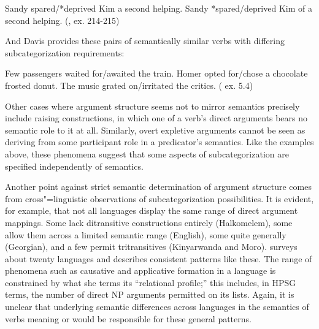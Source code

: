 \documentclass[output=paper
                ,modfonts
                ,nonflat
	        ,collection
	        ,collectionchapter
	        ,collectiontoclongg
 	        ,biblatex
                ,babelshorthands
                ,newtxmath
                ,draftmode
                ,colorlinks, citecolor=brown
]{./langsci/langscibook}
\begin{document}
\begin{exe}
\ex \label{ps-subcat-ex}
\begin{xlist}
\ex    Sandy spared/*deprived Kim a second helping.
\ex    Sandy *spared/deprived Kim of a second helping.
(\citet{pollard+sag:1987}, ex. 214-215)
\end{xlist}
\end{exe}

\noindent
And Davis provides these pairs of semantically similar verbs with differing subcategorization requirements:

\begin{exe}
\ex \label{ard-subcat-ex}
\begin{xlist}
\ex    Few passengers waited for/awaited the train.
\ex    Homer opted for/chose a chocolate frosted donut.
\ex    The music grated on/irritated the critics.
(\citet{Davis2001} ex. 5.4)
\end{xlist}
\end{exe}

Other cases where argument structure seems not to mirror semantics precisely include raising constructions, in which one of a verb's direct arguments bears no semantic role to it at all.
Similarly, overt expletive arguments cannot be seen as deriving from some participant role in a predicator's semantics.
Like the examples above, these phenomena suggest that some aspects of subcategorization are specified independently of semantics.

Another point against strict semantic determination of argument structure comes from cross"=linguistic observations of subcategorization possibilities.
It is evident, for example, that not all languages display the same range of direct argument mappings.
Some lack ditransitive  constructions entirely (Halkomelem), some allow them across a limited semantic range (English), some quite generally (Georgian), and a few permit tritransitives (Kinyarwanda and Moro).
\citet{Gerdts1992} surveys about twenty languages and describes consistent patterns like these.
The range of phenomena such as causative and applicative formation in a language is constrained by what she terms its ``relational profile;'' this includes, in HPSG terms, the number of direct NP arguments permitted on its \argst lists.
Again, it is unclear that underlying semantic differences across languages in the semantics of verbs meaning  or  would be responsible for these general patterns.
\end{document}
